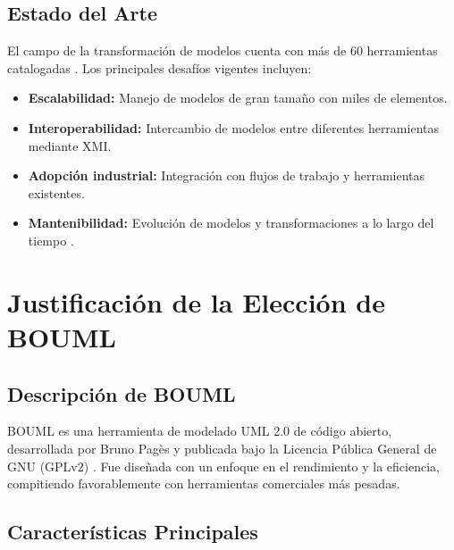 \documentclass[12pt,a4paper]{article}
\begin{document}
\subsection{Estado del Arte}

El campo de la transformación de modelos cuenta con más de 60 herramientas catalogadas \cite{kahani2019}. Los principales desafíos vigentes incluyen:

\begin{itemize}
    \item \textbf{Escalabilidad:} Manejo de modelos de gran tamaño con miles de elementos.
    \item \textbf{Interoperabilidad:} Intercambio de modelos entre diferentes herramientas mediante XMI.
    \item \textbf{Adopción industrial:} Integración con flujos de trabajo y herramientas existentes.
    \item \textbf{Mantenibilidad:} Evolución de modelos y transformaciones a lo largo del tiempo \cite{bucchiarone2020}.
\end{itemize}

\newpage
\section{Justificación de la Elección de BOUML}

\subsection{Descripción de BOUML}

BOUML es una herramienta de modelado UML 2.0 de código abierto, desarrollada por Bruno Pagès y publicada bajo la Licencia Pública General de GNU (GPLv2) \cite{bouml}. Fue diseñada con un enfoque en el rendimiento y la eficiencia, compitiendo favorablemente con herramientas comerciales más pesadas.

\subsection{Características Principales}
\end{document}
